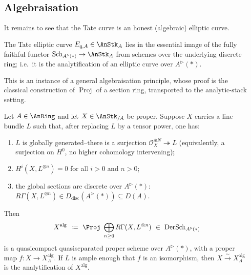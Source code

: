 \subsection{Algebraisation}
\label{subsec:21:algebraisation}

It remains to see that the Tate curve is an honest (algebraic) elliptic curve.

\begin{theorem}[$E_q$ is algebraic]
\label{thm:21:tate-algebraic}
The Tate elliptic curve $E_{q,A}\in\AnStk_A$ lies in the essential image of the
fully faithful functor $\mathrm{Sch}_{A^{\triangleright}(\ast)}\to\AnStk_A$ from
schemes over the underlying discrete ring; i.e.\ it is the analytification of an
elliptic curve over $A^{\triangleright}(\ast)$.
\end{theorem}

This is an instance of a general algebraisation principle, whose proof is the
classical construction of $\operatorname{Proj}$ of a section ring, transported to
the analytic-stack setting.

\begin{proposition}
\label{prop:21:algebraisation}
Let $A\in\AnRing$ and let $X\in\AnStk_{/A}$ be proper. Suppose $X$ carries a line
bundle $L$ such that, after replacing $L$ by a tensor power, one has:
\begin{enumerate}
\item $L$ is globally generated--there is a surjection
$\mathcal O_X^{\oplus N}\twoheadrightarrow L$ (equivalently, a surjection on
$H^0$, no higher cohomology intervening);
\item $H^i(X,L^{\otimes n})=0$ for all $i>0$ and $n>0$;
\item the global sections are discrete over $A^{\triangleright}(\ast)$:
$R\Gamma(X,L^{\otimes n})\in D_{\mathrm{disc}}(A^{\triangleright}(\ast))\subseteq D(A)$.
\end{enumerate}
Then
\begin{equation*}
X^{\mathrm{alg}}\ :=\ \Proj\ \bigoplus_{n\ge0} R\Gamma(X,L^{\otimes n})\ \in\
\mathrm{DerSch}_{A^{\triangleright}(\ast)}
\end{equation*}
is a quasicompact quasiseparated proper scheme over $A^{\triangleright}(\ast)$,
with a proper map $f\colon X\to X^{\mathrm{alg}}_A$. If $L$ is ample enough that
$f$ is an isomorphism, then $X\xrightarrow{\sim}X^{\mathrm{alg}}_A$ is the
analytification of $X^{\mathrm{alg}}$.
\end{proposition}

